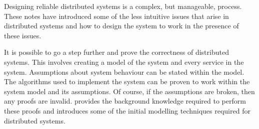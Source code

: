 Designing reliable distributed systems is a complex, but manageable, process.
These notes have introduced some of the less intuitive issues that arise in distributed systems
and how to design the system to work in the presence of these issues.

It is possible to go a step further and prove the correctness of distributed systems.
This involves creating a model of the system and every service in the system.
Assumptions about system behaviour can be stated within the model.
The algorithms used to implement the system can be proven to work within the system model and its assumptions.
Of course, if the assumptions are broken, then any proofs are invalid.
provides the background knowledge required to perform these proofs
and introduces some of the initial modelling techniques required for distributed systems.